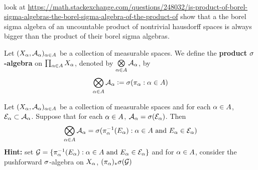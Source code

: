 \documentclass{book}
\begin{document}
	\tcb{\#\#\#\#\#\#\#\#\#\#\#\#\#\#\#\#\#\#\#\#\#\#\#\#\#\#\#\#\#\#\#\#\#\#\#\#}
	\\
	 look at \href{https://math.stackexchange.com/questions/248032/is-product-of-borel-sigma-algebras-the-borel-sigma-algebra-of-the-product-of}{https://math.stackexchange.com/questions/248032/is-product-of-borel-sigma-algebras-the-borel-sigma-algebra-of-the-product-of} show that a the borel sigma algebra of an uncountable product of nontrivial hausdorff spaces is always bigger than the product of their borel sigma algebras. \\
	\tcr{\#\#\#\#\#\#\#\#\#\#\#\#\#\#\#\#\#\#\#\#\#\#\#\#\#\#\#\#\#\#\#\#\#\#\#\#}
	
	\begin{defn} 
		Let $(X_{\alpha}, \mathcal{A}_{\alpha})_{\alpha \in A}$ be a collection of measurable spaces. We define the \textbf{product $\sigma$-algebra} on $\prod_{\alpha \in A}X_{\alpha}$, denoted by $\bigotimes\limits_{\alpha \in A} \mathcal{A}_{\alpha}$, by $$\bigotimes\limits_{\alpha \in A} \mathcal{A}_{\alpha} \vcentcolon= \sigma(\pi_{\alpha}: \alpha \in A)$$
	\end{defn}

	\begin{ex} 
		Let $(X_{\alpha}, \mathcal{A}_{\alpha})_{\alpha \in A}$ be a collection of measurable spaces and for each $\alpha \in A$, $\mathcal{E}_{\alpha} \subset \mathcal{A}_{\alpha}$. Suppose that for each $\alpha \in A$, $\mathcal{A}_{\alpha} = \sigma(\mathcal{E}_{\alpha})$. Then 
		$$\bigotimes\limits_{\alpha \in A} \mathcal{A}_{\alpha} = \sigma( \pi_{\alpha}^{-1}(E_{\alpha}): \alpha \in A \text{ and } E_{\alpha} \in \mathcal{E}_{\alpha})$$ 
		\textbf{Hint:} set $\mathcal{G} = \{\pi_{\alpha}^{-1}(E_{\alpha}): \alpha \in A \text{ and } E_{\alpha} \in \mathcal{E}_{\alpha}\}$ and for $\alpha \in A$, consider the pushforward $\sigma$-algebra on $X_{\alpha}$, $(\pi_{\alpha})_* \sigma( \mathcal{G})$
	\end{ex}
\end{document}
